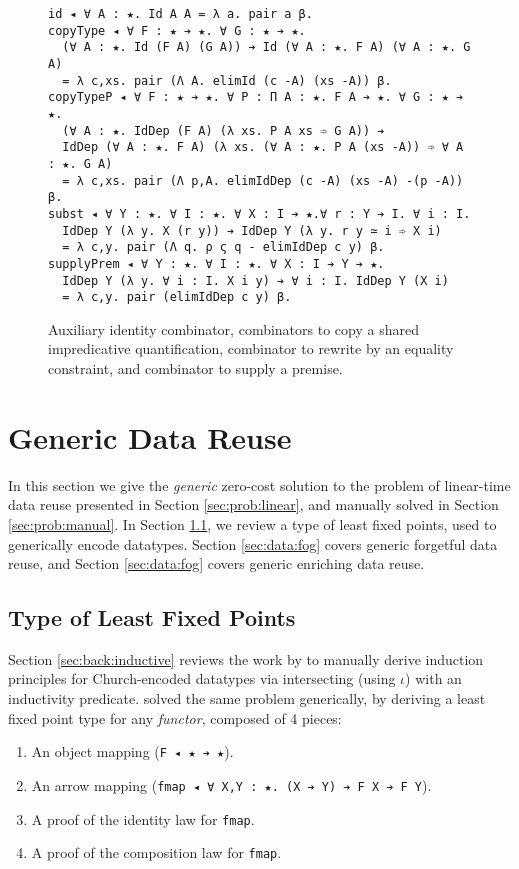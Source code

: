 \documentclass[acmsmall,screen]{acmart}
\newcommand{\refsec}[1]{Section \ref{sec:#1}}
\newcommand{\labsec}[1]{\label{sec:#1}}
\newcommand{\labfig}[1]{\label{fig:#1}}
\begin{document}
\begin{figure}
\centering

\begin{verbatim}
id ◂ ∀ A : ★. Id A A = λ a. pair a β.
copyType ◂ ∀ F : ★ ➔ ★. ∀ G : ★ ➔ ★.
  (∀ A : ★. Id (F A) (G A)) ➔ Id (∀ A : ★. F A) (∀ A : ★. G A)
  = λ c,xs. pair (Λ A. elimId (c -A) (xs -A)) β.
copyTypeP ◂ ∀ F : ★ ➔ ★. ∀ P : Π A : ★. F A ➔ ★. ∀ G : ★ ➔ ★.
  (∀ A : ★. IdDep (F A) (λ xs. P A xs ➾ G A)) ➔
  IdDep (∀ A : ★. F A) (λ xs. (∀ A : ★. P A (xs -A)) ➾ ∀ A : ★. G A)
  = λ c,xs. pair (Λ p,A. elimIdDep (c -A) (xs -A) -(p -A)) β.
subst ◂ ∀ Y : ★. ∀ I : ★. ∀ X : I ➔ ★.∀ r : Y ➔ I. ∀ i : I.
  IdDep Y (λ y. X (r y)) ➔ IdDep Y (λ y. r y ≃ i ➾ X i)
  = λ c,y. pair (Λ q. ρ ς q - elimIdDep c y) β.
supplyPrem ◂ ∀ Y : ★. ∀ I : ★. ∀ X : I ➔ Y ➔ ★.
  IdDep Y (λ y. ∀ i : I. X i y) ➔ ∀ i : I. IdDep Y (X i)
  = λ c,y. pair (elimIdDep c y) β.
\end{verbatim}

\caption{Auxiliary identity combinator, combinators to copy a shared
  impredicative quantification, combinator to rewrite by
  an equality constraint, and combinator to supply a premise.} 
\labfig{aux}
\end{figure}

\section{Generic Data Reuse}
\labsec{data}

In this section we give the \textit{generic} zero-cost solution to the problem of
linear-time data reuse presented in \refsec{prob:linear}, and manually
solved in \refsec{prob:manual}. In \refsec{data:fix}, we review a
type of least fixed points, used to generically encode datatypes.
\refsec{data:fog} covers generic forgetful data reuse, and
\refsec{data:fog} covers generic enriching data reuse.

\subsection{Type of Least Fixed Points}
\labsec{data:fix}

\refsec{back:inductive} reviews the work by \citet{stump18} to
manually derive induction principles for Church-encoded datatypes via
intersecting (using $\iota$) with an inductivity predicate.
\citet{firsov18a} solved the same problem generically, by deriving a
least fixed point type for any \textit{functor}, composed of 4 pieces:
\begin{enumerate}
\item An object mapping (\verb;F ◂ ★ ➔ ★;).
\item An arrow mapping
  (\verb;fmap ◂ ∀ X,Y : ★. (X ➔ Y) ➔ F X ➔ F Y;).
\item A proof of the identity law for \verb;fmap;.
\item A proof of the composition law for \verb;fmap;.
\end{enumerate}
\end{document}
